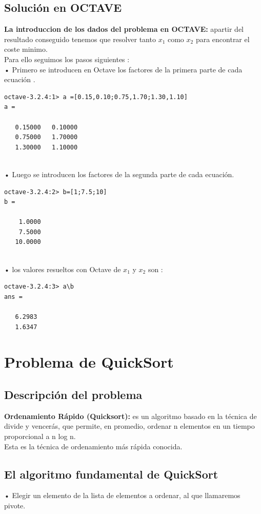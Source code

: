 \documentclass[a4,12pt]{article}
\begin{document}
\subsection{Solución en OCTAVE}
 
\textbf {La introduccion de los dados del problema en OCTAVE: } apartir del resultado conseguido  tenemos que resolver tanto $x_1$ como $x_2$ para encontrar el coste minimo.\\
Para ello seguimos los pasos siguientes : \\

• Primero se introducen en Octave los factores de la primera parte de cada ecuación .\\
\begin{verbatim}
octave-3.2.4:1> a =[0.15,0.10;0.75,1.70;1.30,1.10]
a =

   0.15000   0.10000
   0.75000   1.70000
   1.30000   1.10000
   
\end{verbatim}

• Luego se introducen los factores de la segunda parte de cada ecuación.\\
\begin{verbatim}
octave-3.2.4:2> b=[1;7.5;10]
b =

    1.0000
    7.5000
   10.0000
   
\end{verbatim}

• los valores resueltos con Octave de $x_1$ y $x_2$ son :\\
\begin{verbatim}
octave-3.2.4:3> a\b
ans =

   6.2983
   1.6347
\end{verbatim}

\section{Problema de QuickSort}
\subsection{Descripción del problema}
\textbf {Ordenamiento Rápido (Quicksort): } es un algoritmo basado en la técnica de divide y vencerás, que permite, en promedio, ordenar n elementos en un tiempo proporcional a n log n.\\
Esta es la técnica de ordenamiento más rápida conocida.\\

\subsection{El algoritmo fundamental de QuickSort}
• Elegir un elemento de la lista de elementos a ordenar, al que llamaremos pivote.\\
\end{document}
